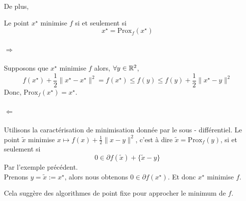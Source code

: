 \documentclass[a4paper,12pt]{article}
\newcommand{\prox}{\text{Prox}}
\begin{document}
De plus, 
\begin{propriete}
Le point $x^{\star}$ minimise $f$ si et seulement si 
$$
x^{\star} = \prox_f(x^{\star})
$$
\end{propriete} 
\begin{preuve}
\vspace{-1cm}
\paragraph{$\Rightarrow$} Supposons que $x^{\star}$ minimise $f$ alors, $\forall y\in\mathbb{R}^2$,
$$
f(x^{\star}) +\frac{1}{2}\|x^{\star}-x^{\star}\|^2 = f(x^{\star})\leq f(y)\leq f(y)+\frac{1}{2}\|x^{\star}-y\|^2
$$
Donc, $\prox_f(x^{\star}) = x^{\star}$.
\paragraph{$\Leftarrow$} Utilisons la caractérisation de minimisation donnée par le sous - différentiel. Le point $\tilde{x}$ minimise $x\mapsto f(x) +\frac{1}{2}\|x-y\|^2$, c'est à dire $\tilde{x} = \prox_f(y)$, si et seulement si 
$$
0\in \partial f(\tilde{x}) + \{\tilde{x}-y\}
$$
Par l'exemple précédent. \\
Prenons $y=\tilde{x}:=x^{\star}$, alors nous obtenons $0\in\partial f(x^{\star})$. Et donc $x^{\star}$ minimise $f$.
\end{preuve}

Cela suggère des algorithmes de point fixe pour approcher le minimum de $f$. 

%
 
\end{document}

